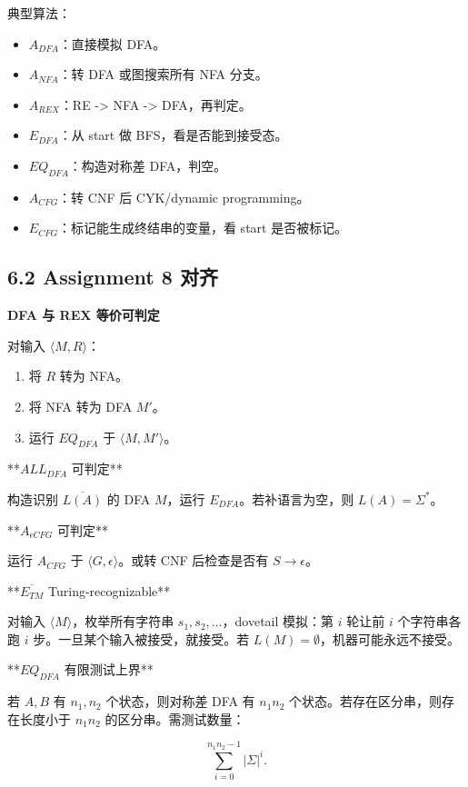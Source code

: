 ﻿\documentclass[UTF8,11pt]{ctexart}
\begin{document}
典型算法：


\begin{itemize}
\item \(A_{DFA}\)：直接模拟 DFA。
\item \(A_{NFA}\)：转 DFA 或图搜索所有 NFA 分支。
\item \(A_{REX}\)：RE -> NFA -> DFA，再判定。
\item \(E_{DFA}\)：从 start 做 BFS，看是否能到接受态。
\item \(EQ_{DFA}\)：构造对称差 DFA，判空。
\item \(A_{CFG}\)：转 CNF 后 CYK/dynamic programming。
\item \(E_{CFG}\)：标记能生成终结串的变量，看 start 是否被标记。
\end{itemize}


\subsection{6.2 Assignment 8 对齐}


\textbf{DFA 与 REX 等价可判定}


对输入 \(\langle M,R\rangle\)：


\begin{enumerate}
\item 将 \(R\) 转为 NFA。
\item 将 NFA 转为 DFA \(M'\)。
\item 运行 \(EQ_{DFA}\) 于 \(\langle M,M'\rangle\)。
\end{enumerate}


**\(ALL_{DFA}\) 可判定**


构造识别 \(\overline{L(A)}\) 的 DFA \(M\)，运行 \(E_{DFA}\)。若补语言为空，则 \(L(A)=\Sigma^*\)。


**\(A_{\epsilon CFG}\) 可判定**


运行 \(A_{CFG}\) 于 \(\langle G,\epsilon\rangle\)。或转 CNF 后检查是否有 \(S\to\epsilon\)。


**\(\overline{E_{TM}}\) Turing-recognizable**


对输入 \(\langle M\rangle\)，枚举所有字符串 \(s_1,s_2,\ldots\)，dovetail 模拟：第 \(i\) 轮让前 \(i\) 个字符串各跑 \(i\) 步。一旦某个输入被接受，就接受。若 \(L(M)=\emptyset\)，机器可能永远不接受。


**\(EQ_{DFA}\) 有限测试上界**


若 \(A,B\) 有 \(n_1,n_2\) 个状态，则对称差 DFA 有 \(n_1n_2\) 个状态。若存在区分串，则存在长度小于 \(n_1n_2\) 的区分串。需测试数量：

\[
\sum_{i=0}^{n_1n_2-1}|\Sigma|^i.
\]
\end{document}
